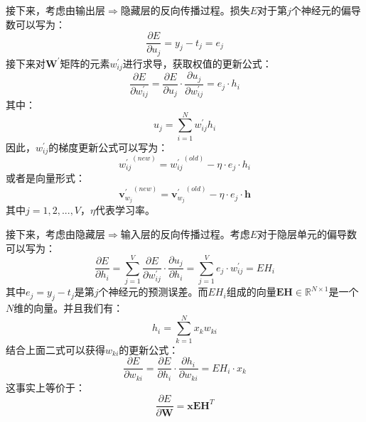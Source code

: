 \documentclass[UTF8, 12pt]{ctexart}
\begin{document}
	接下来，考虑由输出层$\Rightarrow$隐藏层的反向传播过程。损失$E$对于第$j$个神经元的偏导数可以写为：
	\begin{equation}
		\frac{\partial E}{\partial u_{j}} = y_{j} - t_{j} = e_{j}
	\end{equation}
	接下来对$\textbf{W}^{'}$矩阵的元素$w_{ij}^{'}$进行求导，获取权值的更新公式：
	\begin{equation}
		\frac{\partial E}{\partial w_{ij}^{'}} = \frac{\partial E}{\partial u_{j}} \cdot \frac{\partial u_{j}}{\partial w_{ij}^{'}} = e_{j} \cdot h_{i}
	\end{equation}
	其中：
	\begin{equation}
		u_{j} = \sum_{i=1}^{N} w_{ij}^{'} h_{i}
	\end{equation}
	因此，$w_{ij}^{'}$的梯度更新公式可以写为：
	\begin{equation}
		{w_{ij}^{'}}^{(new)} = {w_{ij}^{'}}^{(old)} - \eta \cdot e_{j} \cdot h_{i}
	\end{equation}
	或者是向量形式：
	\begin{equation}
		{\textbf{v}_{w_{j}}^{'}}^{(new)} = {\textbf{v}_{w_{j}}^{'}}^{(old)} - \eta \cdot e_{j} \cdot \textbf{h}
	\end{equation}
	其中$j=1,2,...,V$，$\eta$代表学习率。
	
	接下来，考虑由隐藏层$\Rightarrow$输入层的反向传播过程。考虑$E$对于隐层单元的偏导数可以写为：
	\begin{equation}
		\frac{\partial E}{\partial h_{i}} = \sum_{j=1}^{V} \frac{\partial E}{\partial w_{ij}^{'}} \cdot \frac{\partial u_{j}}{\partial h_{i}} =
		\sum_{j=1}^{V} e_{j} \cdot w_{ij}^{'} = EH_{i}
	\end{equation}
	其中$e_{j} = y_{j} - t_{j}$是第$j$个神经元的预测误差。而$EH_{i}$组成的向量$\textbf{EH} \in \mathbb{R}^{N \times 1}$是一个$N$维的向量。并且我们有：
	\begin{equation}
		h_{i} = \sum_{k=1}^{N} x_{k} w_{ki}
	\end{equation}
	结合上面二式可以获得$w_{ki}$的更新公式：
	\begin{equation}
		\frac{\partial E}{\partial w_{ki}} = \frac{\partial E}{\partial h_{i}} \cdot \frac{\partial h_{i}}{\partial w_{ki}} = EH_{i} \cdot x_{k}
	\end{equation}
	这事实上等价于：
	\begin{equation}
		\frac{\partial E}{\partial \textbf{W}} = \textbf{x}\textbf{EH}^{T}
	\end{equation}
	
	
\end{document}

